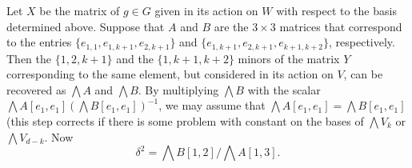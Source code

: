 \documentclass[12pt]{amsart}
\theoremstyle{definition}
\begin{document}
Let $X$ be the matrix of $g\in G$ given in its action on $W$ with respect to
the basis determined above. Suppose that $A$ and $B$ are the $3\times 3$
matrices  that correspond to the entries $\{e_{1,1},e_{1,k+1},e_{2,k+1}\}$
and $\{e_{1,k+1},e_{2,k+1},e_{k+1,k+2}\}$, respectively. Then the $\{1,2,k+1\}$ and
the $\{1,k+1,k+2\}$ minors of the matrix $Y$ corresponding to the same
element, but considered in its action on $V$, can be recovered as $\bigwedge A$
and $\bigwedge B$. By multiplying $\bigwedge B$ with the scalar
$\bigwedge A[e_1,e_1](\bigwedge B[e_1,e_1])^{-1}$, we may assume that
$\bigwedge A[e_1,e_1]=\bigwedge B[e_1,e_1]$ (this step corrects if there
is some problem with constant on the
bases of $\bigwedge V_k$ or $\bigwedge V_{d-k}$. Now
\[
\delta^2=\bigwedge B[1,2]/\bigwedge A[1,3].
\]
\end{document}

